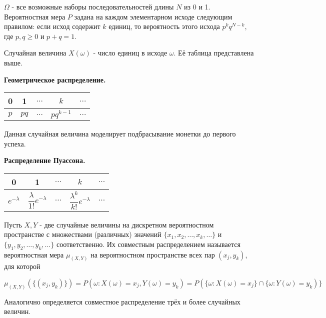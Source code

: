 \documentclass[a4paper]{article}
\begin{document}
\begin{colloq}
\begin{example}
   	$\Omega$ - все возможные наборы последовательностей длины $N$ из 0 и 1. Вероятностная мера $P$ задана на каждом элементарном исходе следующим правилом: если исход содержит $k$ единиц, то вероятность этого исхода $p^k	q^{N-k}$, где $p, q \geqslant 0$ и $p + q = 1$.
   	
   	Случайная величина $X(\omega)$ - число единиц в исходе $\omega$. Её таблица представлена выше.
   \end{example}

	\begin{example}
		
		\textbf{Геометрическое распределение.}
		
		\begin{tabular}{ | c | c | c | c | c |}
			\hline
			0 & 1 & $\dots$ & $k$ & $\dots$ \\ \hline
			$p$ & $pq$ & $\dots$ & $p q^{k-1}$ & $\dots$ \\
			\hline
		\end{tabular}
		
		Данная случайная величина моделирует подбрасывание монетки до первого успеха.
	\end{example}

	\begin{example}
		
		\textbf{Распределение Пуассона.}
		
		\begin{tabular}{ | c | c | c | c | c |}
			\hline
			0 & 1 & $\dots$ & $k$ & $\dots$ \\ \hline
			$e^{-\lambda}$ & $\dfrac{\lambda}{1!} e^{-\lambda}$ & $\dots$ & $\dfrac{\lambda^k}{k!} e^{-\lambda}$ & $\dots$ \\
			\hline
		\end{tabular}
	
	\end{example}

	\begin{definition*}
	Пусть $X, Y$ - две случайные величины на дискретном вероятностном пространстве с множествами (различных) значений $\{x_1, x_2, \dots, x_k, \dots\}$ и $\{y_1, y_2, \dots, y_k, \dots\}$ соответственно. Их совместным распределением называется вероятностная мера $\mu_{(X,Y)}$ на вероятностном пространстве всех пар $(x_j, y_k)$, для которой 
	
	$\mu_{(X,Y)}(\{(x_j, y_k)\}) = P(\omega: X(\omega) = x_j, Y(\omega) = y_k) = P(\{\omega: X(\omega) = x_j\} \cap \{\omega: Y(\omega) = y_k)\}$
	
	Аналогично определяется совместное распределение трёх и более случайных величин.
   	\end{definition*}
   

\end{colloq}
\end{document}
